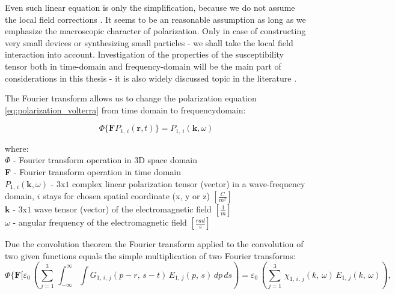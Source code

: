 \documentclass[12pt,twoside,a4paper]{article}
\numberwithin{equation}{subsection}
\numberwithin{figure}{subsection}
\begin{document}
Even such linear equation is only the simplification, because we do not assume the local field corrections \cite{chui_lf_correction}. It seems to be an
reasonable assumption as long as we emphasize the macroscopic character of polarization. Only in case of constructing very small
devices or synthesizing small particles - we shall take the local field interaction into account. Investigation of the properties of the
susceptibility tensor both in time-domain and frequency-domain will be the main part of considerations in this thesis - it is also widely
discussed topic in the literature \cite{boyd_nlo, prasad_intro_nlo, Levenson_dispersion, trager_springer, bloembergen_nonlinear}.

The Fourier transform allows us to change the polarization equation \ref{eq:polarization_volterra} from time domain to frequencydomain:

\begin{equation} \label{eq:polarization_frequency}
   \Phi \{ \textbf{F} P_{1, \, i} ( \textbf{r}, t) \} = P_{1, \, i} (\textbf{k}, \omega )
\end{equation}

where: \\
$\Phi $ - Fourier transform operation in $3$D space domain \\
\textbf{F} - Fourier transform operation in time domain \\
${P_{1, \,i}} (\textbf{k},\omega )$ - $3$x$1$ complex linear polarization tensor (vector) in a wave-frequency domain,
                                        $i$ stays for chosen spatial coordinate (x, y or z) $[\frac {C}{m^{2}}]$ \\
$\textbf{k}$ - $3$x$1$ wave tensor (vector) of the electromagnetic field $[\frac {1}{m}]$ \\
$\omega $ - angular frequency of the electromagnetic field $[\frac {rad}{s}]$


Due the convolution theorem \cite{katznelson_introduction} the Fourier transform applied to the convolution of two given functions equals
the simple multiplication of two Fourier transforms:
\begin{equation} \label{eq:convolution_theorem}
  \Phi \textbf{\{F}[ {\varepsilon_{0}}\, \left(  \! \sum_{j=1}^{3}\,\int_{ - \infty }^{\infty }
    \int {G_{1, \,i, \,j}}(p - r, \,s - t)\,{E_{1, \,j}}(p, \,s)\,dp\,ds \!  \right) =
    {\varepsilon_{0}}\,(\sum_{j=1}^{3}\,{\chi_{1, \,i, \,j}}(k, \,\omega )\,{E_{1, \,j}}(k, \,\omega )),
\end{equation}
\end{document}
